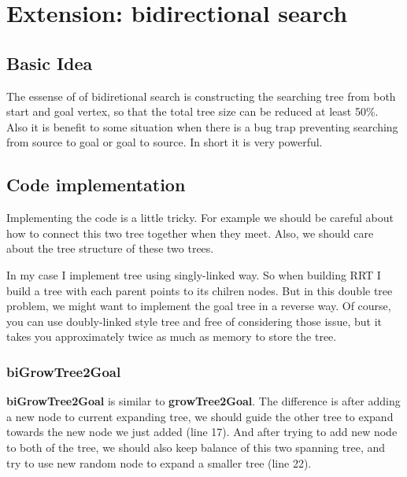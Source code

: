 \documentclass{article}
\begin{document}
\clearpage
\section{Extension: bidirectional search}
\subsection{Basic Idea}
The essense of of bidiretional search is constructing the searching tree from both start and goal vertex, so that the total tree size can be reduced at least 50\%. Also it is benefit to some situation when there is a bug trap preventing searching from source to goal or goal to source. In short it is very powerful.

\subsection{Code implementation}

Implementing the code is a little tricky. For example we should be careful about how to connect this two tree together when they meet. Also, we should care about the tree structure of these two trees. 

In my case I implement tree using singly-linked way. So when building RRT I build a tree with each parent points to its chilren nodes. But in this double tree problem, we might want to implement the goal tree in a reverse way. Of course, you can use doubly-linked style tree and free of considering those issue, but it takes you approximately twice as much as memory to store the tree.

\subsubsection{biGrowTree2Goal}


\textbf{biGrowTree2Goal} is similar to \textbf{growTree2Goal}. The difference is after adding a new node to current expanding tree, we should guide the other tree to expand towards the new node we just added (line 17). And after trying to add new node to both of the tree, we should also keep balance of this two spanning tree, and try to use new random node to expand a smaller tree (line 22).
\end{document}
